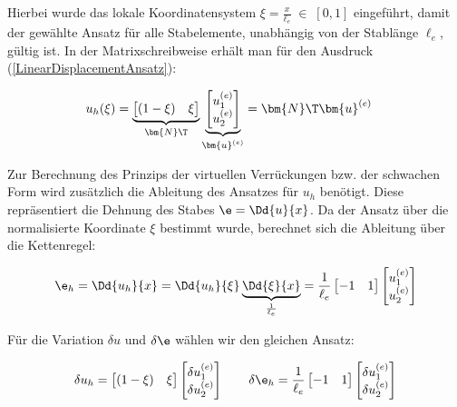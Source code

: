 Hierbei wurde das lokale Koordinatensystem $\xi = \frac{x}{\ell_e} \; \in \; [0,1]$  eingeführt, damit der gewählte Ansatz für alle Stabelemente, unabhängig von der Stablänge $\ell_e$, gültig ist. In der Matrixschreibweise erhält man für den Ausdruck (\ref{LinearDisplacementAnsatz}):

\begin{align}
  u_h(\xi) & = \underbrace{\begin{bmatrix} (1-\xi) & \xi \end{bmatrix}}_{\bm{N}\T} \underbrace{\begin{bmatrix} u_1^{(e)} \\ u_2^{(e)}\end{bmatrix}}_{\bm{u}^{(e)}} = \bm{N}\T \bm{u}^{(e)}
 \end{align}

Zur Berechnung des Prinzips der virtuellen Verrückungen bzw. der schwachen Form wird zusätzlich die Ableitung des Ansatzes für $u_h$ benötigt. Diese repräsentiert die Dehnung des Stabes $\e = \Dd{u}{x}$. Da der Ansatz über die normalisierte Koordinate $\xi$ bestimmt wurde, berechnet sich die Ableitung über die Kettenregel:

\begin{equation}
\e_h = \Dd{u_h}{x} = \Dd{u_h}{\xi} \underbrace{\Dd{\xi}{x}}_{\frac{1}{\ell_e}} = \frac{1}{\ell_e} \begin{bmatrix} -1 & 1 \end{bmatrix} \begin{bmatrix} u_1^{(e)} \\ u_2^{(e)}\end{bmatrix}
\end{equation}

Für die Variation $\delta u$ und $\delta \e$ wählen wir den gleichen Ansatz:

\begin{equation}
\delta u_h = \begin{bmatrix}  (1-\xi) & \xi \end{bmatrix} \begin{bmatrix} \delta u_1^{(e)} \\ \delta u_2^{(e)}\end{bmatrix} \qquad \delta \e_h = \frac{1}{\ell_e} \begin{bmatrix} -1 & 1 \end{bmatrix} \begin{bmatrix} \delta u_1^{(e)} \\ \delta u_2^{(e)}\end{bmatrix}
\end{equation}

